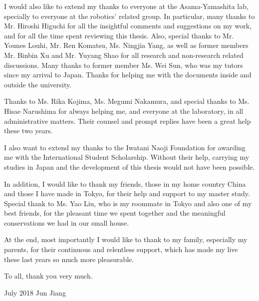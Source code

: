 I would also like to extend my thanks to everyone at the Asama-Yamashita lab, specially to everyone at the robotics' related group. In particular, many thanks to Mr. Hiroshi Higuchi for all the insightful comments and suggestions on my work, and for all the time spent reviewing this thesis. Also, special thanks to Mr. Younes Louhi, Mr. Ren Komatsu, Ms. Ningjia Yang, as well as former members Mr. Binbin Xu and Mr. Yuyang Shao for all research and non-research related discussions. Many thanks to former member Ms. Wei Sun, who was my tutors since my arrival to Japan. Thanks for helping me with the documents inside and outside the university. 

Thanks to Ms. Rika Kojima, Ms. Megumi Nakamura, and special thanks to Ms. Hisae Narushima for always helping me, and everyone at the laboratory, in all administrative matters. Their counsel and prompt replies have been a great help these two years. 

I also want to extend my thanks to the Iwatani Naoji Foundation for awarding me with the International Student Scholarship. Without their help, carrying my studies in Japan and the development of this thesis would not have been possible.

In addition, I would like to thank my friends, those in my home country China and those I have made in Tokyo, for their help and support to my master study. Special thank to Ms. Yao Liu, who is my roommate in Tokyo and also one of my best friends, for the pleasant time we spent together and the meaningful conservations we had in our small house.  

At the end, most importantly I would like to thank to my family, especially my parents, for their continuous and relentless support, which has made my live these last years so much more pleasurable.

To all, thank you very much.

\begin{flushright}
July 2018 \enspace Jun Jiang
\end{flushright}


